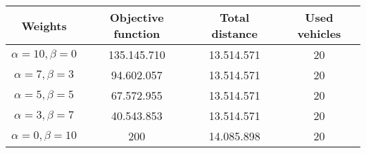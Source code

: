 {
\renewcommand{\arraystretch}{2}
\begin{longtable}[h]{| c | c | c | c |}
    \hline
    \textbf{Weights} & \textbf{Objective function} & \textbf{Total distance} & \textbf{Used vehicles} \\
    \hline
    \endhead
    $\alpha = 10, \beta = 0$ & 135.145.710 & 13.514.571 & 20 \\
    \hline
    $\alpha = 7, \beta = 3$  &  94.602.057 & 13.514.571 & 20 \\
    \hline
    $\alpha = 5, \beta = 5$  &  67.572.955 & 13.514.571 & 20 \\
    \hline
    $\alpha = 3, \beta = 7$  &  40.543.853 & 13.514.571 & 20 \\
    \hline
    $\alpha = 0, \beta = 10$ &         200 & 14.085.898 & 20 \\
    \hline
\end{longtable}
}
